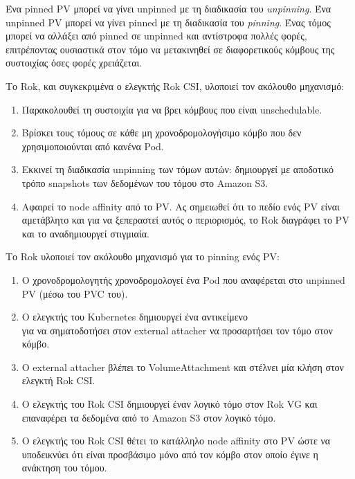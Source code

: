 Ένα pinned PV μπορεί να γίνει unpinned με τη διαδικασία του \textit{unpinning}.
Ένα unpinned PV μπορεί να γίνει pinned με τη διαδικασία του \textit{pinning}.
Ένας τόμος μπορεί να αλλάξει από pinned σε unpinned και αντίστροφα πολλές φορές,
επιτρέποντας ουσιαστικά στον τόμο να μετακινηθεί σε διαφορετικούς κόμβους της
συστοιχίας όσες φορές χρειάζεται.


Το Rok, και συγκεκριμένα ο ελεγκτής Rok CSI, υλοποιεί τον ακόλουθο μηχανισμό:
\begin{enumerate}
      \tightlist
      \item Παρακολουθεί τη συστοιχία για να βρει κόμβους που είναι
            unschedulable.
      \item Βρίσκει τους τόμους σε κάθε μη χρονοδρομολογήσιμο κόμβο που δεν
            χρησιμοποιούνται από κανένα Pod.
      \item Εκκινεί τη διαδικασία unpinning των τόμων αυτών: δημιουργεί με
            αποδοτικό τρόπο snapshots των δεδομένων του τόμου στο Amazon S3.
      \item Αφαιρεί το node affinity από το PV. Ας σημειωθεί ότι το πεδίο
             ενός PV είναι αμετάβλητο και για να ξεπεραστεί
            αυτός ο περιορισμός, το Rok διαγράφει το PV και το αναδημιουργεί
            στιγμιαία.
\end{enumerate}

Το Rok υλοποιεί τον ακόλουθο μηχανισμό για το pinning ενός PV:
\begin{enumerate}
      \tightlist
      \item Ο χρονοδρομολογητής χρονοδρομολογεί ένα Pod που αναφέρεται στο
            unpinned PV (μέσω του PVC του).
      \item Ο ελεγκτής  του Kubernetes δημιουργεί ένα
            αντικείμενο\\  για να σηματοδοτήσει στον
            external attacher να προσαρτήσει τον τόμο στον κόμβο.
      \item Ο external attacher βλέπει το VolumeAttachment και στέλνει μία κλήση
             στον ελεγκτή Rok CSI.
      \item O ελεγκτής του Rok CSI  δημιουργεί έναν λογικό τόμο στον Rok VG και
            επαναφέρει τα δεδομένα από το Amazon S3 στον λογικό τόμο.
      \item Ο ελεγκτής του Rok CSI θέτει το κατάλληλο node affinity στο PV ώστε
            να υποδεικνύει ότι είναι προσβάσιμο μόνο από τον κόμβο στον οποίο
            έγινε η ανάκτηση του τόμου.
\end{enumerate}

